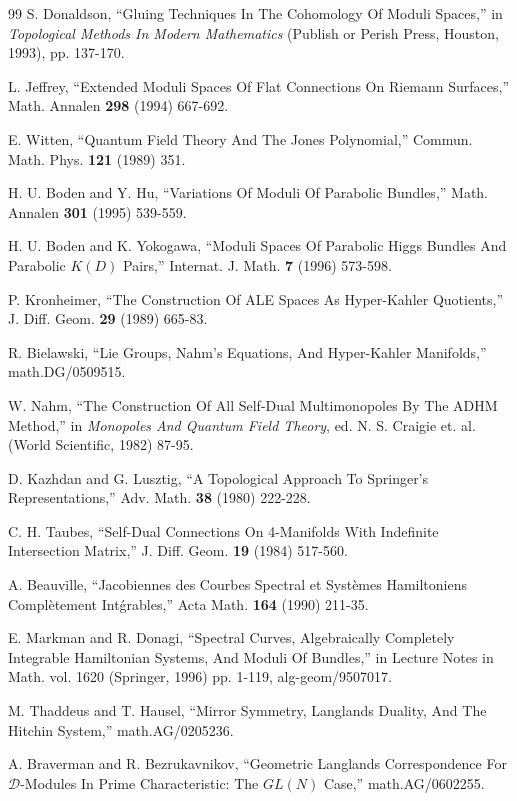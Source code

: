 \begin{thebibliography}{99}
 S. Donaldson, ``Gluing Techniques In The Cohomology Of Moduli Spaces,'' in {\it Topological
Methods In Modern Mathematics} (Publish or Perish Press, Houston, 1993), pp. 137-170.

 L.
 Jeffrey, ``Extended Moduli Spaces Of Flat Connections On Riemann Surfaces,'' Math. Annalen
 {\bf 298} (1994) 667-692.

 E. Witten,
``Quantum Field Theory And The Jones Polynomial,'' Commun. Math. Phys.
{\bf 121} (1989) 351.

 H. U. Boden and Y. Hu, ``Variations Of Moduli Of
Parabolic Bundles,'' Math. Annalen {\bf 301} (1995) 539-559.

 H. U. Boden and K. Yokogawa,
``Moduli Spaces Of Parabolic Higgs Bundles And Parabolic $K(D)$ Pairs,'' Internat. J.
Math. {\bf 7} (1996) 573-598.

 P.
Kronheimer, ``The Construction Of ALE Spaces As Hyper-Kahler Quotients,''
J. Diff. Geom. {\bf 29} (1989) 665-83.

 R.
Bielawski, ``Lie Groups, Nahm's Equations, And Hyper-Kahler Manifolds,'' math.DG/0509515.

 W. Nahm, ``The Construction Of All
Self-Dual Multimonopoles By The ADHM Method,'' in {\it Monopoles And Quantum Field Theory},
ed. N. S. Craigie et. al. (World Scientific, 1982) 87-95.

 D. Kazhdan and G. Lusztig, ``A Topological Approach
To Springer's Representations,'' Adv. Math. {\bf 38} (1980) 222-228.

 C. H. Taubes, ``Self-Dual Connections
On 4-Manifolds With Indefinite Intersection Matrix,'' J. Diff. Geom. {\bf 19} (1984)
517-560.

 A. Beauville, ``Jacobiennes des Courbes
Spectral et Syst\`emes Hamiltoniens Compl\`etement Int\'grables,'' Acta Math. {\bf 164}
(1990) 211-35.

 E. Markman and R. Donagi, ``Spectral Curves, Algebraically Completely
Integrable Hamiltonian Systems, And Moduli Of Bundles,'' in Lecture Notes in Math. vol. 1620
(Springer, 1996) pp.  1-119,  alg-geom/9507017.

 M. Thaddeus and T. Hausel, ``Mirror Symmetry, Langlands Duality, And
The Hitchin System,'' math.AG/0205236.

 A. Braverman and R. Bezrukavnikov, ``Geometric Langlands Correspondence
For ${\mathcal D}$-Modules In Prime Characteristic: The $GL(N)$ Case,'' math.AG/0602255.


\end{thebibliography}
